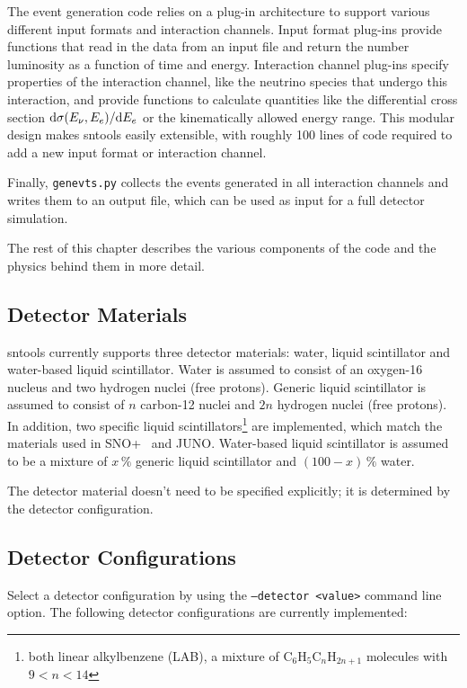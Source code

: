 \documentclass[11pt, oneside]{article}
\renewcommand{\d}{\mathrm{d}}
\newcommand{\tdiffx}[3][\empty]{\ifx\empty#1
		\d #2 / \d #3
	\else
		\d^{#1} #2 / \d #3^{#1}
	\fi} %
\begin{document}
The event generation code relies on a plug-in architecture to support various different input formats and interaction channels.
Input format plug-ins provide functions that read in the data from an input file and return the number luminosity as a function of time and energy.
Interaction channel plug-ins specify properties of the interaction channel, like the neutrino species that undergo this interaction, and provide functions to calculate quantities like the differential cross section $\tdiffx{\sigma (E_\nu, E_e)}{E_e}$ or the kinematically allowed energy range.
This modular design makes sntools easily extensible, with roughly 100 lines of code required to add a new input format or interaction channel.

Finally, \texttt{genevts.py} collects the events generated in all interaction channels and writes them to an output file, which can be used as input for a full detector simulation.

The rest of this chapter describes the various components of the code and the physics behind them in more detail.


\subsection{Detector Materials}
sntools currently supports three detector materials: water, liquid scintillator and water-based liquid scintillator.
Water is assumed to consist of an oxygen-16 nucleus and two hydrogen nuclei (free protons).
Generic liquid scintillator is assumed to consist of $n$ carbon-12 nuclei and $2n$ hydrogen nuclei (free protons).
In addition, two specific liquid scintillators\footnote{both linear alkylbenzene (LAB), a mixture of C$_6$H$_5$C$_n$H$_{2n+1}$ molecules with $9<n<14$} are implemented, which match the materials used in SNO+~\cite{anderson2021development} and JUNO.
Water-based liquid scintillator is assumed to be a mixture of $x\,\%$ generic liquid scintillator and $(100-x)\,\%$ water.

The detector material doesn’t need to be specified explicitly; it is determined by the detector configuration.


\subsection{Detector Configurations}\label{sec:detector-configurations}
Select a detector configuration by using the \texttt{--detector <value>} command line option. The following detector configurations are currently implemented:
\end{document}
